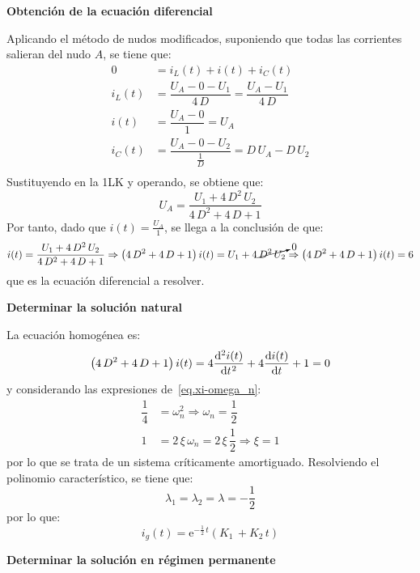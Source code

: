 \begin{example}
  \textbf{Obtención de la ecuación diferencial}
	    
  Aplicando el método de nudos modificados, suponiendo que todas las
  corrientes salieran del nudo $A$, se tiene que:
  \begin{align*}
    0&=i_L(t)+i(t)+i_C(t)\\
    i_L(t)&=\dfrac{U_A-0-U_1}{4\,D}=\dfrac{U_A-U_1}{4\,D}\\
    i(t)&=\dfrac{U_A-0}{1}=U_A\\
    i_C(t)&=\dfrac{U_A-0-U_2}{\frac{1}{D}}=D\,U_A-D\,U_2\\
  \end{align*}
  Sustituyendo en la 1LK y operando, se obtiene que:
  \begin{equation*}
    U_A=\dfrac{U_1+4\,D^2\,U_2}{4\,D^2+4\,D+1}
  \end{equation*}
  Por tanto, dado que $i(t)=\frac{U_A}{1}$, se llega a la conclusión
  de que:
  \begin{equation*}
    i(t)=\dfrac{U_1+4\,D^2\,U_2}{4\,D^2+4\,D+1}\Rightarrow \left(4\,D^2+4\,D+1\right) i(t)=U_1+4\,\cancelto{0}{D^2\,U_2}\Rightarrow \left(4\,D^2+4\,D+1\right) i(t)=6
  \end{equation*}
  que es la ecuación diferencial a resolver.
	    
  \textbf{Determinar la solución natural}
	    
  La ecuación homogénea es:
  \begin{equation*}
    \left(4\,D^2+4\,D+1\right) i(t)=4\diff[2]{i(t)}{t}+4\diff{i(t)}{t}+1=0
  \end{equation*}
  y considerando las expresiones de~\eqref{eq.xi-omega_n}:
  \begin{align*}
    \dfrac{1}{4}&=\omega_n^2\Rightarrow \omega_n=\dfrac{1}{2}\\
    1&=2\,\xi\,\omega_n=2\,\xi\,\dfrac{1}{2}\Rightarrow \xi = 1
  \end{align*}
  por lo que se trata de un sistema críticamente
  amortiguado. Resolviendo el polinomio característico, se tiene que:
  \begin{equation*}
    \lambda_1=\lambda_2=\lambda=-\dfrac{1}{2}
  \end{equation*}
  por lo que:
  \begin{equation*}
    i_g(t)=\mathrm{e}^{-\frac{1}{2}\,t}(K_1\,+K_2\,t) 
  \end{equation*}
	    
  \textbf{Determinar la solución en régimen permanente}
	    

\end{example}
